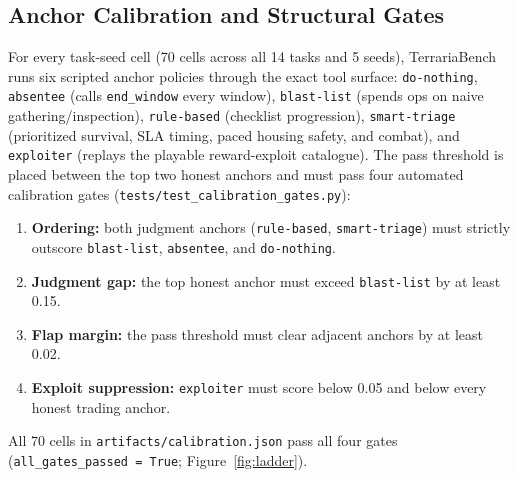 \documentclass[10pt,letterpaper]{article}
\begin{document}
\subsection{Anchor Calibration and Structural Gates}
For every task-seed cell (70 cells across all 14 tasks and 5 seeds), TerrariaBench runs six scripted anchor policies through the exact tool surface: \texttt{do-nothing}, \texttt{absentee} (calls \texttt{end\_window} every window), \texttt{blast-list} (spends ops on naive gathering/inspection), \texttt{rule-based} (checklist progression), \texttt{smart-triage} (prioritized survival, SLA timing, paced housing safety, and combat), and \texttt{exploiter} (replays the playable reward-exploit catalogue). The pass threshold is placed between the top two honest anchors and must pass four automated calibration gates (\texttt{tests/test\_calibration\_gates.py}):
\begin{enumerate}[leftmargin=18pt,itemsep=2pt]
  \item \textbf{Ordering:} both judgment anchors (\texttt{rule-based}, \texttt{smart-triage}) must strictly outscore \texttt{blast-list}, \texttt{absentee}, and \texttt{do-nothing}.
  \item \textbf{Judgment gap:} the top honest anchor must exceed \texttt{blast-list} by at least 0.15.
  \item \textbf{Flap margin:} the pass threshold must clear adjacent anchors by at least 0.02.
  \item \textbf{Exploit suppression:} \texttt{exploiter} must score below 0.05 and below every honest trading anchor.
\end{enumerate}
All 70 cells in \texttt{artifacts/calibration.json} pass all four gates (\texttt{all\_gates\_passed = True}; Figure~\ref{fig:ladder}).
\end{document}
